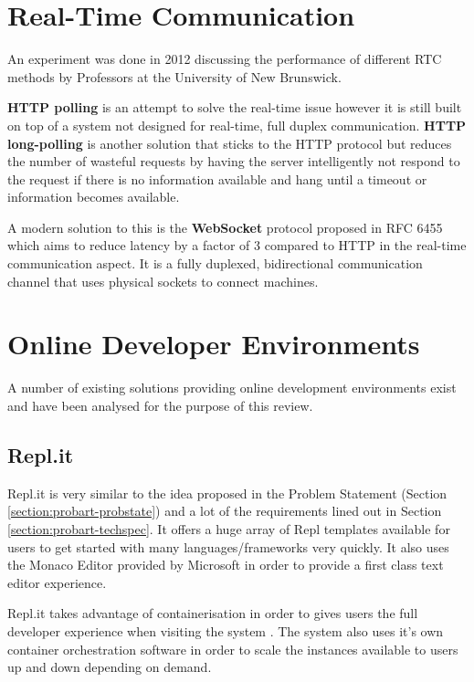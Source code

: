\section{Real-Time Communication} \label{lit-web}

An experiment was done in 2012 discussing the performance of different RTC methods by Professors at the University of New Brunswick\cite{websocket}.

\textbf{HTTP polling} is an attempt to solve the real-time issue however it is still built on top of a system not designed for real-time, full duplex communication. \textbf{HTTP long-polling} is another solution that sticks to the HTTP protocol but reduces the number of wasteful requests by having the server intelligently not respond to the request if there is no information available and hang until a timeout or information becomes available.

A modern solution to this is the \textbf{WebSocket} protocol proposed in RFC 6455 \cite{wsrfc} which aims to reduce latency by a factor of 3 compared to HTTP in the real-time communication aspect. It is a fully duplexed, bidirectional communication channel that uses physical sockets to connect machines.

\section{Online Developer Environments} \label{lit-ode}

A number of existing solutions providing online development environments exist and have been analysed for the purpose of this review.

\subsection{Repl.it}

Repl.it is very similar to the idea proposed in the Problem Statement (Section \ref{section:probart-probstate}) and a lot of the requirements lined out in Section \ref{section:probart-techspec}. It offers a huge array of Repl templates available for users to get started with many languages/frameworks very quickly. It also uses the Monaco Editor provided by Microsoft in order to provide a first class text editor experience.

Repl.it takes advantage of containerisation in order to gives users the full developer experience when visiting the system \cite{replit-containers}. The system also uses it's own container orchestration software in order to scale the instances available to users up and down depending on demand.

